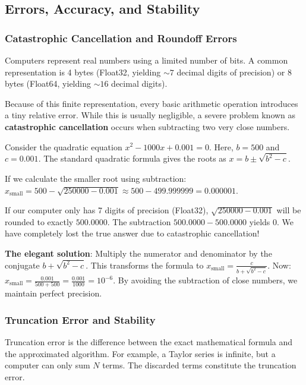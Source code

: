 \subsection{Errors, Accuracy, and Stability}

\subsubsection{Catastrophic Cancellation and Roundoff Errors}
Computers represent real numbers using a limited number of bits. A common
representation is 4 bytes (Float32, yielding $\sim 7$ decimal digits of
precision) or 8 bytes (Float64, yielding $\sim 16$ decimal digits).

Because of this finite representation, every basic arithmetic operation
introduces a tiny relative error. While this is usually negligible, a severe
problem known as \textbf{catastrophic cancellation} occurs when subtracting
two very close numbers.

\begin{tcolorbox}[colback=blue!5!white,colframe=blue!75!black,
  title=Pedagogical Example: The Quadratic Formula]
Consider the quadratic equation $x^2 - 1000x + 0.001 = 0$. Here, $b = 500$
and $c = 0.001$. The standard quadratic formula gives the roots as
$x = b \pm \sqrt{b^2 - c}$.

If we calculate the smaller root using subtraction:
$x_{\text{small}} = 500 - \sqrt{250000 - 0.001} \approx 500 - 499.999999 =
0.000001$.

If our computer only has 7 digits of precision (Float32),
$\sqrt{250000 - 0.001}$ will be rounded to exactly $500.0000$. The
subtraction $500.0000 - 500.0000$ yields $0$. We have completely lost the
true answer due to catastrophic cancellation!

\textbf{The elegant solution}: Multiply the numerator and denominator by the
conjugate $b + \sqrt{b^2-c}$. This transforms the formula to
$x_{\text{small}} = \frac{c}{b + \sqrt{b^2 - c}}$.
Now: $x_{\text{small}} = \frac{0.001}{500 + 500} = \frac{0.001}{1000} =
10^{-6}$. By avoiding the subtraction of close numbers, we maintain perfect
precision.
\end{tcolorbox}

\subsubsection{Truncation Error and Stability}
Truncation error is the difference between the exact mathematical formula and
the approximated algorithm. For example, a Taylor series is infinite, but a
computer can only sum $N$ terms. The discarded terms constitute the truncation
error.

